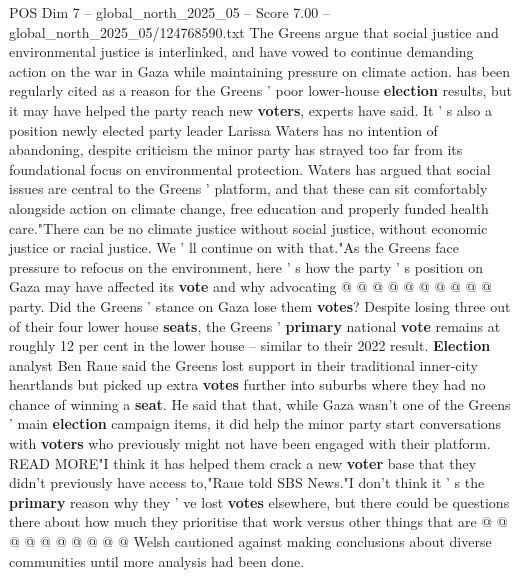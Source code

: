 \begin{textsample}{POS Dim 7 – global\_north\_2025\_05 – Score 7.00 – global\_north\_2025\_05/124768590.txt}  \label{ex:f7_pos_328}
The Greens argue that social justice and environmental justice is interlinked, and have vowed to continue demanding action on the war in Gaza while maintaining pressure on climate action. has been regularly cited as a reason for the Greens ' poor lower-house \textbf{election} results, but it may have helped the party reach new \textbf{voters}, experts have said.
It ' s also a position newly elected party leader Larissa Waters has no intention of abandoning, despite criticism the minor party has strayed too far from its foundational focus on environmental protection.
Waters has argued that social issues are central to the Greens ' platform, and that these can sit comfortably alongside action on climate change, free education and properly funded health care."There can be no climate justice without social justice, without economic justice or racial justice.
We ' ll continue on with that."As the Greens face pressure to refocus on the environment, here ' s how the party ' s position on Gaza may have affected its \textbf{vote} and why advocating @ @ @ @ @ @ @ @ @ @ party.
Did the Greens ' stance on Gaza lose them \textbf{votes}?
Despite losing three out of their four lower house \textbf{seats}, the Greens ' \textbf{primary} national \textbf{vote} remains at roughly 12 per cent in the lower house -- similar to their 2022 result. \textbf{Election} analyst Ben Raue said the Greens lost support in their traditional inner-city heartlands but picked up extra \textbf{votes} further into suburbs where they had no chance of winning a \textbf{seat}.
He said that that, while Gaza wasn't one of the Greens ' main \textbf{election} campaign items, it did help the minor party start conversations with \textbf{voters} who previously might not have been engaged with their platform.
READ MORE"I think it has helped them crack a new \textbf{voter} base that they didn't previously have access to,"Raue told SBS News."I don't think it ' s the \textbf{primary} reason why they ' ve lost \textbf{votes} elsewhere, but there could be questions there about how much they prioritise that work versus other things that are @ @ @ @ @ @ @ @ @ @ Welsh cautioned against making conclusions about diverse communities until more analysis had been done.

\end{textsample}
